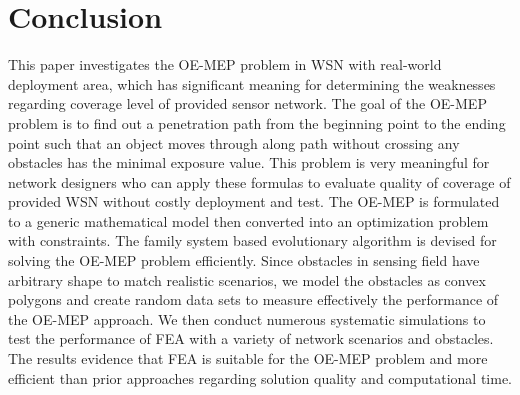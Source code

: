 \documentclass[final]{elsarticle}
\begin{document}
\section{Conclusion}
This paper investigates the OE-MEP problem in WSN with real-world deployment area, which has significant meaning for determining the weaknesses regarding coverage level of provided sensor network. The goal of the OE-MEP problem is to find out a penetration path from the beginning point to the ending point such that an object moves through along path without crossing any obstacles has the minimal exposure value. This problem is very meaningful for network designers who can apply these formulas to evaluate quality of coverage of provided WSN without costly deployment and test. The OE-MEP is formulated to a generic mathematical model then converted into an optimization problem with constraints. The family system based evolutionary algorithm is devised for solving the OE-MEP problem efficiently. Since obstacles in sensing field have arbitrary shape to match realistic scenarios, we model the obstacles as convex polygons and create random data sets to measure effectively the performance of the OE-MEP approach. We then conduct numerous systematic simulations to test the performance of FEA with a variety of network scenarios and obstacles. The results evidence that FEA is suitable for the OE-MEP problem and more efficient than prior approaches regarding solution quality and computational time. 
\begin{landscape}

\end{landscape}

\end{document}
